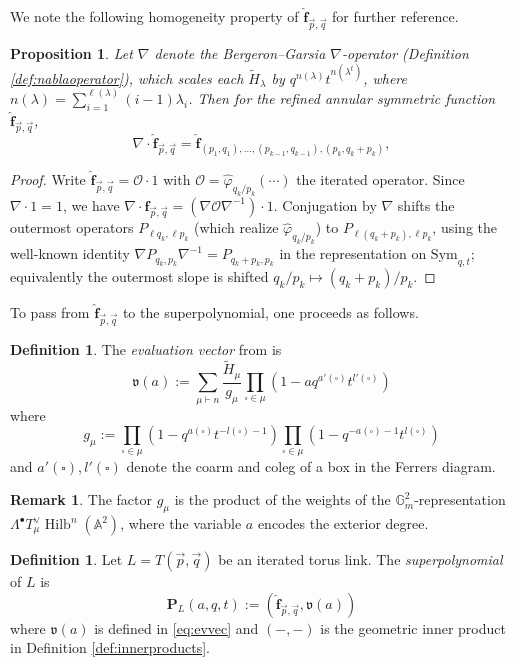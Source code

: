 \documentclass{amsart}
\numberwithin{equation}{section}
\newtheorem{proposition}[lemma]{Proposition}%
\theoremstyle{definition}
\newtheorem{remark}[lemma]{Remark}%
\newtheorem{definition}[lemma]{Definition}%
\def\tilde{\widetilde}
\def\hat{\widehat}
\def\Sym{{\mathrm{Sym}}}
\DeclareMathOperator{\Hilb}{Hilb}
\newcommand{\tH}{\widetilde{H}}
\renewcommand{\th}{\tilde{h}}
\newcommand{\cO}{\mathcal{O}}
\newcommand{\fv}{\mathfrak{v}}
\newcommand{\A}{\mathbb{A}}
\newcommand{\G}{\mathbb{G}}
\newcommand{\fqrs}{\hat{\mathbf{f}}_{\vec{p},\vec{q}}}
\begin{document}
We note the following homogeneity property of $\fqrs$ for further reference.
\begin{proposition}
\label{prop:homog-annular}
Let $\nabla$ denote the Bergeron--Garsia $\nabla$-operator (Definition \ref{def:nablaoperator}), which scales each $\tH_\lambda$ by $q^{n(\lambda)}t^{n(\lambda^t)}$, where $n(\lambda)=\sum_{i=1}^{\ell(\lambda)}(i-1)\lambda_i$. Then for the refined annular symmetric function $\fqrs$,
$$\nabla \cdot \fqrs = \widehat{\mathbf{f}}_{(p_1, q_1), \ldots, (p_{k-1}, q_{k-1}), (p_k, q_k+p_k)},$$
\end{proposition}
\begin{proof}
Write $\fqrs=\cO\cdot 1$ with $\cO=\widehat{\varphi}_{q_k/p_k}(\cdots)$ the iterated operator. Since $\nabla\cdot 1=1$, we have $\nabla\cdot\fqrs=(\nabla\cO\nabla^{-1})\cdot 1$. Conjugation by $\nabla$ shifts the outermost operators $P_{\ell q_k,\ell p_k}$ (which realize $\widehat{\varphi}_{q_k/p_k}$) to $P_{\ell(q_k+p_k),\ell p_k}$, using the well-known identity $\nabla P_{q_k,p_k}\nabla^{-1}=P_{q_k+p_k,p_k}$ in the representation on $\Sym_{q,t}$; equivalently the outermost slope is shifted $q_k/p_k\mapsto (q_k+p_k)/p_k$.
\end{proof}

To pass from $\fqrs$ to the superpolynomial, one proceeds as follows.
\begin{definition}\label{def:evvec}
The {\em evaluation vector} from \cite[Eq. (39)]{GN} is
\begin{equation}
\label{eq:evvec}
\fv(a):=\sum_{\mu\vdash n}\frac{\tH_\mu}{g_\mu}\prod_{\square\in \mu}(1-aq^{a'(\square)}t^{l'(\square)})
\end{equation}
where 
$$g_\mu:=\prod_{\square\in\mu}(1-q^{a(\square)}t^{-l(\square)-1})\prod_{\square\in\mu}(1-q^{-a(\square)-1}t^{l(\square)})$$
and $a'(\square),l'(\square)$ denote the coarm and coleg of a box in the Ferrers diagram.
\end{definition}
\begin{remark}
The factor $g_\mu$ is the product of the weights of the $\G_m^2$-representation $\Lambda^\bullet T_\mu^\vee\Hilb^n(\A^2)$, where the variable $a$ encodes the exterior degree.
\end{remark}
\begin{definition}
\label{def:superpolynomial}
Let $L=T(\vec{p},\vec{q})$ be an iterated torus link. The {\em superpolynomial} of $L$ is 
$$\mathbf{P}_L(a,q,t):=(\fqrs,\mathfrak{v}(a))$$
where $\mathfrak{v}(a)$ is defined in \eqref{eq:evvec} and $(-,-)$ is the geometric inner product in Definition \ref{def:innerproducts}.
\end{definition}
\end{document}
